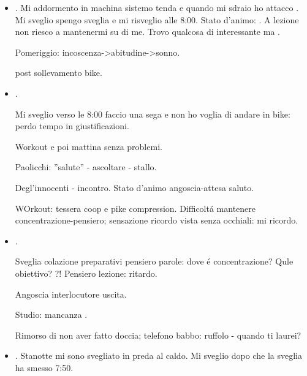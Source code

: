 \begin{itemize}
Workout addominali-latte tiepido doccia tiepida: no problem svenimento dopo caf\'e. Pomkeriggio lento come mattina solo pieno di . Workout pike compression:  (promemoria); pike compression intensit\'a determinazione memoria situazione. Birra-pizza-sonno-agitazione.

\item {}. Mi addormento in machina sistemo tenda e quando mi sdraio ho attacco . Mi sveglio spengo sveglia e mi risveglio alle 8:00. Stato d'animo: .
A lezione non riesco a mantenermi su di me. Trovo qualcosa di interessante ma . 

Pomeriggio: incoscenza->abitudine->sonno.

 post sollevamento bike.

\item {}. 

Mi sveglio verso le 8:00 faccio una sega e non ho voglia di andare in bike: perdo tempo in giustificazioni.

Workout e poi mattina senza problemi.

Paolicchi: ''salute'' - ascoltare - stallo.

Degl'innocenti -  incontro. Stato d'animo angoscia-attesa saluto.

WOrkout: tessera coop e pike compression. Difficolt\'a mantenere concentrazione-pensiero; sensazione ricordo vista senza occhiali: mi ricordo.

\item {}.

Sveglia colazione preparativi pensiero parole: dove \'e concentrazione? Qule obiettivo?  ?! Pensiero lezione: ritardo.

Angoscia interlocutore uscita.

Studio:  mancanza .

Rimorso di non aver fatto doccia; telefono babbo: ruffolo - quando ti laurei?

\item {}. Stanotte mi sono svegliato in preda al caldo. Mi sveglio dopo che la sveglia ha smesso 7:50.


\end{itemize}
